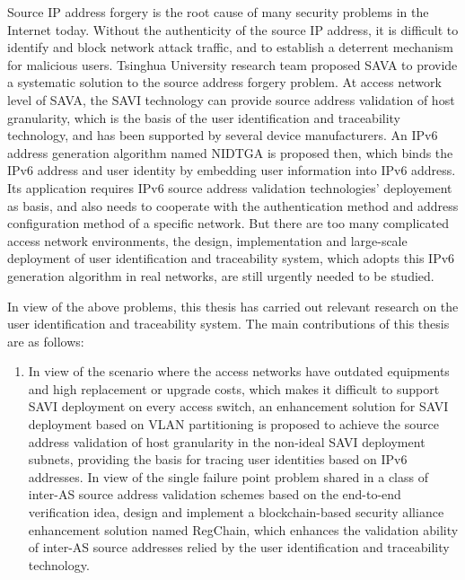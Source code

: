 \begin{abstract*}
 Source IP address forgery is the root cause of many security problems in the Internet today. Without the authenticity of the source IP address, it is difficult to identify and block network attack traffic, and to establish a deterrent mechanism for malicious users. Tsinghua University research team proposed SAVA  to provide a systematic solution to the source address forgery problem. At access network level of SAVA, the SAVI technology can provide source address validation of host granularity, which is the basis of the user identification and traceability technology, and has been supported by several device manufacturers. An IPv6 address generation algorithm named NIDTGA is proposed then, which binds the IPv6 address and user identity by embedding user information into IPv6 address. Its application requires IPv6 source address validation technologies' deployement as basis, and also needs to cooperate with the authentication method and address configuration method of a specific network. But there are too many complicated access network environments, the design, implementation and large-scale deployment of user identification and traceability system, which adopts this IPv6 generation algorithm in real networks, are still urgently needed to be studied.

  In view of the above problems, this thesis has carried out relevant research on the user identification and traceability system. The main contributions of this thesis are as follows:
  \begin{enumerate}[1{)}]
    \item In view of the scenario where the access networks have outdated equipments and high replacement or upgrade costs, which makes it difficult to support SAVI deployment on every access switch, an enhancement solution for SAVI deployment based on VLAN partitioning is proposed to achieve the source address validation of host granularity in the non-ideal SAVI deployment subnets, providing the basis for tracing user identities based on IPv6 addresses. In view of the single failure point problem shared in a class of inter-AS source address validation schemes based on the end-to-end verification idea, design and implement a blockchain-based security alliance enhancement solution named RegChain, which enhances the validation ability of inter-AS source addresses relied by the user identification and traceability technology.


\end{enumerate}
\end{abstract*}
